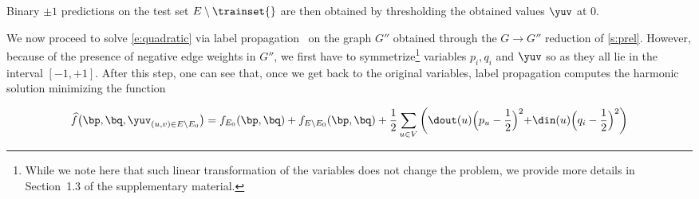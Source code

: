 Binary $\pm 1$ predictions on the test set $E\setminus \trainset{}$ are then obtained by
thresholding the obtained values $\yuv$ at $0$.

\iffalse
********************************************************
and then solve for parameters $\{p_u, q_i\}_{u=1}^{|V|}$.
Yet, it may well be the case that some such parameters never occur in all these equations.\footnote
{
On the other hand, recall that no pairing $(u,v) \in E$ can occur more than once here, since \trainset{} is sampled without replacement.
}
This will happen precisely whenever $\Nout(u)$ or $\Nin(v)$ are not represented in \trainset{}. Specifically, if $E_0 \cap \Nout(u) = \emptyset$ then $p_u$ does not occur, and if $E_0 \cap \Nin(v) = \emptyset$ then $q_v$ does not occur. Hence, for each unsampled edge $(\ell,v)\in E\setminus \trainset{}$, we add to~(\ref{e:mlp2}) the equations
\[
p_{\ell}+q_v = 1+y_{\ell,v}~,
\]
motivated by the fact that $\E \left[\frac{1+y_{\ell,v}}{2}\,|\, (\ell,v)\right] =  \frac{p_{\ell}+q_v}{2}$. Similarly, we add to~(\ref{e:mlq2}) the equations
\[
p_u+q_{\ell} = 1+y_{u,\ell}~.
\]
This gives rise to the following set of equations
%
\begin{align}
p_{u}+ \frac{1}{\dout(u)}\,\sum_{v \in \Nout(u)} q_{v}
&=
\frac{1}{\dout(u)}\,\sum_{v=1}^{|V|} (1+\yuv), \qquad u = 1, \ldots, |V|~,\label{e:mlpa}\\
q_{v} +  \frac{1}{\din(v)}\,\sum_{u \in \Nin(v)} p_{u}
&=
\frac{1}{\din(v)}\,\sum_{u=1}^{|V|} (1+\yuv), \qquad v = 1, \ldots, |V|\,,\label{e:mlqa}\\
1+\yuv &= p_u+q_{v},\qquad\qquad\qquad\quad\,\, (u,v) \in E\setminus E_0~.\label{e:mlya}
\end{align}
%
*******************************************************
\fi

We now proceed to solve \eqref{e:quadratic} via label propagation~\autocite{LabelPropa03} on the
graph $G''$ obtained through the $G \rightarrow G''$ reduction of \autoref{s:prel}.
However, because of the presence of negative edge weights in $G''$, we first have to symmetrize\footnote{%
While we note here that such linear transformation of the variables does not change the problem, we
provide more details in Section~1.3 of the supplementary material.} variables $p_i, q_i$ and $\yuv$
so as they all lie in the interval $[-1,+1]$.
After this step, one can see that, once we get back to the original variables, label propagation
computes the harmonic solution minimizing the function

\begin{equation*}
{\widehat f}\big(\bp,\bq,{\yuv}_{(u,v) \in E\setminus E_0}\big)
= f_{E_0}(\bp,\bq) + f_{E\setminus E_0}(\bp,\bq)
+ \frac{1}{2}\sum_{u\in V}
\left(\dout(u)\Bigl(p_u-\frac{1}{2}\Bigl)^2+\din(u)\Bigl(q_i-\frac{1}{2}\Bigl)^2\right)
\end{equation*}


